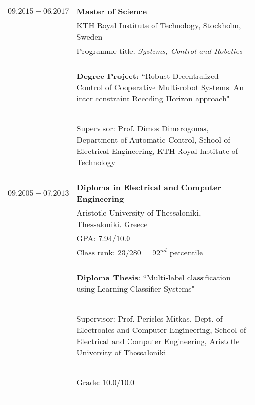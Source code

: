 \documentclass[a4paper,10pt,twoside]{article}
\begin{document}
\begin{tabular}{rp{11cm}}
$09.2015 - 06.2017$ & \textbf{Master of Science} \\
             & KTH Royal Institute of Technology, Stockholm, Sweden\\
             & Programme title: \textit{Systems, Control and Robotics} \\
             & \\
             & \begin{small}\textbf{Degree Project:} ``Robust Decentralized Control of Cooperative Multi-robot Systems:
               An inter-constraint Receding Horizon approach"\end{small} \\
             & \begin{small}Supervisor: Prof. Dimos Dimarogonas, Department of Automatic Control, School of Electrical Engineering,
               KTH Royal Institute of Technology\end{small} \\
&\\
$09.2005 - 07.2013$ & \textbf{Diploma in Electrical and Computer Engineering} \\
                    & Aristotle University of Thessaloniki, Thessaloniki, Greece \\
                    & GPA: $7.94 / 10.0$ \\
                    & Class rank: $23 / 280$ $-$ $92^{nd}$ percentile \\
                    &\\
                    & \begin{small}\textbf{Diploma Thesis}: ``Multi-label classification using Learning Classifier Systems" \end{small}\\
                    & \begin{small}Supervisor: Prof. Pericles Mitkas, Dept. of Electronics and Computer Engineering, School of
                    Electrical and Computer Engineering, Aristotle University of Thessaloniki \end{small}\\
                    & \begin{small}Grade: $10.0 / 10.0$ \end{small}\\
&\\


\end{tabular}
\end{document}
